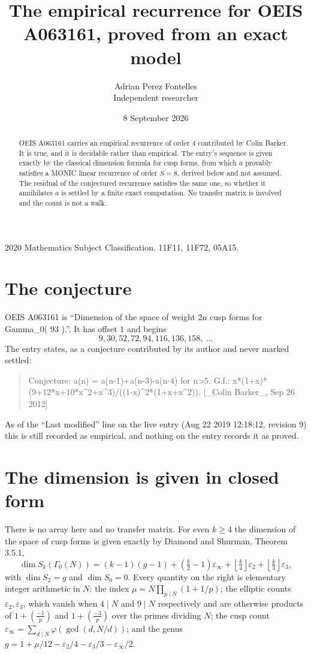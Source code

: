\documentclass[11pt,a4paper]{article}
\title{The empirical recurrence for OEIS A063161, proved from an exact model}
\author{Adrian Perez Fontelles\\ \small Independent researcher}
\date{8 September 2026}
\theoremstyle{plain}
\theoremstyle{definition}
\begin{document}
\maketitle

\begin{abstract}
OEIS A063161 carries an empirical recurrence of order $4$ contributed by Colin Barker. It is true, and it is
decidable rather than empirical. The entry's sequence is given exactly by the classical dimension formula for cusp forms, from
which $a$ provably satisfies a MONIC linear recurrence of order $S=8$, derived below and not
assumed. The residual of the conjectured recurrence satisfies the same one, so whether it
annihilates $a$ is settled by a finite exact computation. No transfer matrix is involved and
the count is not a walk.
\end{abstract}

\noindent\small 2020 Mathematics Subject Classification. 11F11, 11F72, 05A15.\normalsize

\section{The conjecture}

OEIS A063161 is ``Dimension of the space of weight 2n cusp forms for Gamma\_0( 93 ).''. It has offset $1$ and begins
\[
9, 30, 52, 72, 94, 116, 136, 158,\ \dots
\]
The entry states, as a conjecture contributed by its author and never marked settled:
\begin{quote}
Conjecture: a(n) = a(n-1)+a(n-3)-a(n-4) for n>5. G.f.: x*(1+x)*(9+12*x+10*x\^{}2+x\^{}3)/((1-x)\^{}2*(1+x+x\^{}2)). [\_Colin Barker\_, Sep 26 2012]
\end{quote}
As of the ``Last modified'' line on the live entry (Aug 22 2019 12:18:12, revision 9)
this is still recorded as empirical, and nothing on the entry records it as proved.

\section{The dimension is given in closed form}

There is no array here and no transfer matrix. For even $k\ge4$ the dimension of the space of
cusp forms is given exactly by Diamond and Shurman, Theorem 3.5.1,
\[
\dim S_k(\Gamma_0(N))=(k-1)(g-1)+\left(\tfrac{k}{2}-1\right)\varepsilon_\infty
+\left\lfloor\tfrac{k}{4}\right\rfloor\varepsilon_2
+\left\lfloor\tfrac{k}{3}\right\rfloor\varepsilon_3 ,
\]
with $\dim S_2=g$ and $\dim S_0=0$. Every quantity on the right is elementary integer
arithmetic in $N$: the index $\mu=N\prod_{p\mid N}(1+1/p)$; the elliptic counts
$\varepsilon_2,\varepsilon_3$, which vanish when $4\mid N$ and $9\mid N$ respectively and are
otherwise products of $1+\left(\frac{-1}{p}\right)$ and $1+\left(\frac{-3}{p}\right)$
over the primes dividing $N$; the cusp count
$\varepsilon_\infty=\sum_{d\mid N}\varphi(\gcd(d,N/d))$; and the genus
$g=1+\mu/12-\varepsilon_2/4-\varepsilon_3/3-\varepsilon_\infty/2$.
\end{document}
